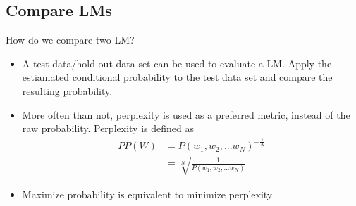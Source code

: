 \documentclass[12pt, oneside]{article}
\begin{document}
\subsection{Compare LMs}
How do we compare two LM?
\begin{itemize}
\item A test data/hold out data set can be used to evaluate a LM. Apply the estiamated conditional probability to the test data set and compare the resulting probability.
\item More often than not, perplexity is used as a preferred metric, instead of the raw probability. Perplexity is defined as 
\begin{align*}
	PP(W)&=P(w_1, w_2, ...w_N)^{-\frac{1}{N}}\\
	&=\sqrt[N]{\frac{1}{P(w_1, w_2, ...w_N)}}
\end{align*}
\item Maximize probability is equivalent to minimize perplexity

\end{itemize}
\end{document}
